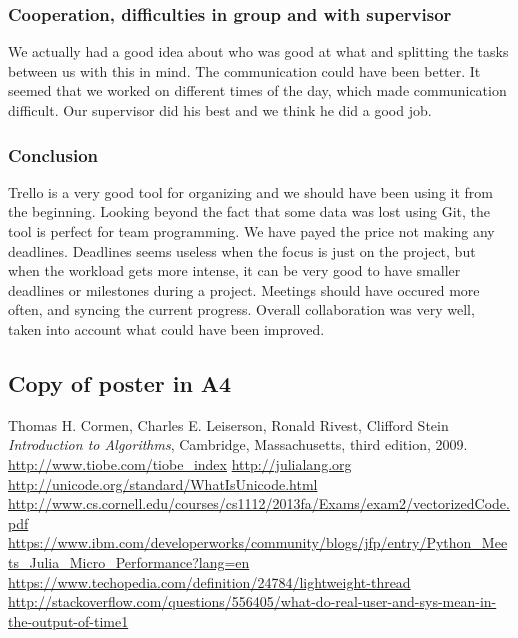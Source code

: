 \documentclass[a4paper, 11pt, titlepage]{article}
\begin{document}
\subsubsection{Cooperation, difficulties in group and with supervisor}
We actually had a good idea about who was good at what and splitting the tasks between us with this in mind. The communication could have been better. It seemed that we worked on different times of the day, which made communication difficult. Our supervisor did his best and we think he did a good job.

\subsubsection{Conclusion}
Trello is a very good tool for organizing and we should have been using it from the beginning. Looking beyond the fact that some data was lost using Git, the tool is perfect for team programming. We have payed the price not making any deadlines. Deadlines seems useless when the focus is just on the project, but when the workload gets more intense, it can be very good to have smaller deadlines or milestones during a project. Meetings should have occured more often, and syncing the current progress. Overall collaboration was very well, taken into account what could have been improved.

\subsection{Copy of poster in A4}

\begin{thebibliography}{9}
	
	Thomas H. Cormen, Charles E. Leiserson, Ronald Rivest, Clifford Stein
	\emph{Introduction to Algorithms},
	Cambridge, Massachusetts,
	third edition,
	2009.
	\url{http://www.tiobe.com/tiobe\_index}
	\url{http://julialang.org}
	\url{http://unicode.org/standard/WhatIsUnicode.html}
	\url{http://www.cs.cornell.edu/courses/cs1112/2013fa/Exams/exam2/vectorizedCode.pdf}
	\url{https://www.ibm.com/developerworks/community/blogs/jfp/entry/Python_Meets_Julia_Micro_Performance?lang=en}
	\url{https://www.techopedia.com/definition/24784/lightweight-thread}
	\url{http://stackoverflow.com/questions/556405/what-do-real-user-and-sys-mean-in-the-output-of-time1}
\end{thebibliography}
\end{document}
